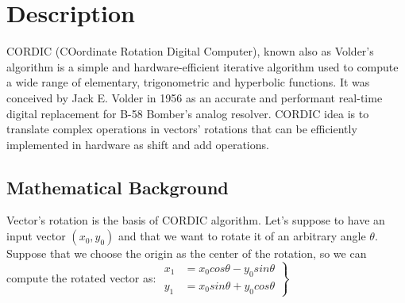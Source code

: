 \section{Description}
CORDIC (COordinate Rotation Digital Computer), known also as Volder's algorithm
is a simple and hardware-efficient iterative algorithm used to compute a wide
range of elementary, trigonometric and hyperbolic functions. \newline
It was conceived by Jack E. Volder in 1956 as an accurate and performant
real-time digital replacement for B-58 Bomber's analog resolver.\newline
CORDIC idea is to translate complex operations in vectors' rotations that can be
efficiently implemented in hardware as shift and add operations.

\subsection{Mathematical Background}
Vector's rotation is the basis of CORDIC algorithm. Let's suppose to have an
input vector $(x_0, y_0)$ and that we want to rotate it of an arbitrary angle 
$\theta$. Suppose that we choose the origin as the center of the rotation, so we
can compute the rotated vector as: \newline
$\left.\begin{gathered}
	x_1 &= x_0cos\theta - y_0sin\theta \\
	y_1 &= x_0sin\theta + y_0cos\theta 
	\end{gathered}
\right\}$
